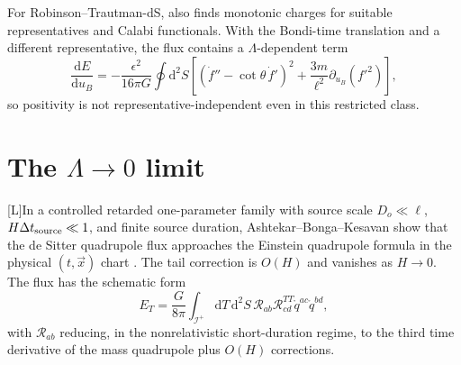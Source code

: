 \documentclass[11pt,a4paper]{article}
\newcommand{\scri}{\mathscr{I}}
\newcommand{\cR}{\mathcal{R}}
\newcommand{\diff}{\mathrm{d}}
\newcommand{\statusL}{\textsf{[L]}}
\begin{document}
For Robinson--Trautman-dS, \cite{poole2025charges} also finds monotonic charges for suitable representatives and Calabi functionals.  With the Bondi-time translation and a different representative, the flux contains a \(\Lambda\)-dependent term
\begin{equation}
  \frac{\diff E}{\diff u_B}
  =
  -\frac{\epsilon^2}{16\pi G}
  \oint \diff^2 S
  \left[
    (\dot f''-\cot\theta\,\dot f')^2
    +\frac{3m}{\ell^2}\partial_{u_B}(f'^2)
  \right],
\end{equation}
so positivity is not representative-independent even in this restricted class.

\section{The \(\Lambda\to0\) limit}

\statusL In a controlled retarded one-parameter family with source scale \(D_o\ll\ell\), \(H\Delta t_{\rm source}\ll1\), and finite source duration, Ashtekar--Bonga--Kesavan show that the de Sitter quadrupole flux approaches the Einstein quadrupole formula in the physical \((t,\vec x)\) chart \cite{ashtekar2015quadrupole}.  The tail correction is \(O(H)\) and vanishes as \(H\to0\).  The flux has the schematic form
\begin{equation}
  E_T
  =
  \frac{G}{8\pi}
  \int_{\scri^+}\diff T\,\diff^2S\,
  \cR_{ab}\cR^{TT}_{cd}\mathring q^{ac}\mathring q^{bd},
\end{equation}
with \(\cR_{ab}\) reducing, in the nonrelativistic short-duration regime, to the third time derivative of the mass quadrupole plus \(O(H)\) corrections.
\end{document}
